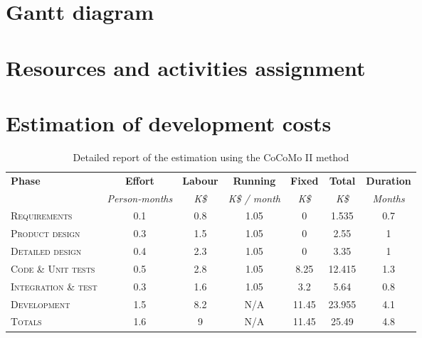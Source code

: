 
\section{Gantt diagram}

\section{Resources and activities assignment}

\section{Estimation of development costs}

\begin{table}[hbtp]
\centering
\begin{tabular}{l|ccccc|c}
\multirow{2}{*}{\textbf{Phase}} & \textbf{Effort} & \textbf{Labour} & \textbf{Running} & \textbf{Fixed} & \textbf{Total} & \textbf{Duration} \\
& \textit{Person-months} & \textit{K\$} & \textit{K\$ / month} & \textit{K\$} & \textit{K\$} & \textit{Months} \\
\textsc{Requirements} & 0.1 & 0.8 & 1.05 & 0 & 1.535 & 0.7 \\
\textsc{Product design} & 0.3 & 1.5 & 1.05 & 0 & 2.55 & 1 \\
\textsc{Detailed design} & 0.4 & 2.3 & 1.05 & 0 & 3.35 & 1 \\
\textsc{Code \& Unit tests} & 0.5 & 2.8 & 1.05 & 8.25 & 12.415 & 1.3 \\
\textsc{Integration \& test} & 0.3 & 1.6 & 1.05 & 3.2 & 5.64 & 0.8 \\ \hline
\textsc{Development} & 1.5 & 8.2 & N/A & 11.45 & 23.955 & 4.1 \\
\textsc{Totals} & 1.6 & 9 & N/A & 11.45 & 25.49 & 4.8
\end{tabular}
\caption{Detailed report of the estimation using the CoCoMo II method}
\label{tblCocomoDetail}
\end{table}

